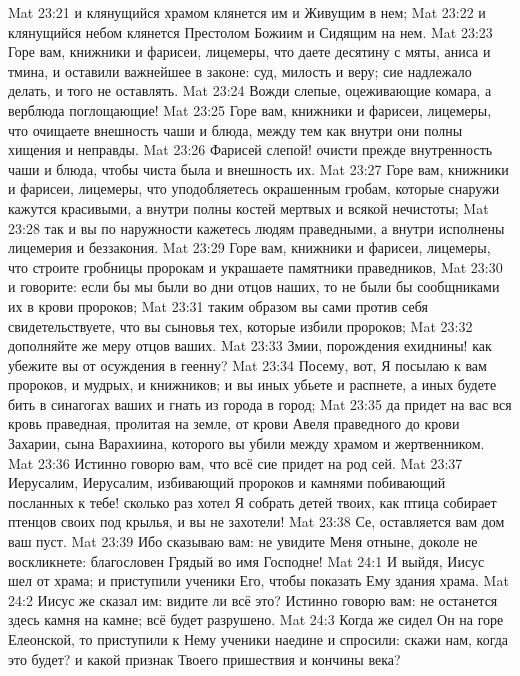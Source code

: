 \vs Mat 23:21 и клянущийся храмом клянется им и Живущим в нем;
\vs Mat 23:22 и клянущийся небом клянется Престолом Божиим и Сидящим на нем.
\vs Mat 23:23 Горе вам, книжники и фарисеи, лицемеры, что даете десятину с мяты, аниса и тмина, и оставили важнейшее в законе: суд, милость и веру; сие надлежало делать, и того не оставлять.
\vs Mat 23:24 Вожди слепые, оцеживающие комара, а верблюда поглощающие!
\vs Mat 23:25 Горе вам, книжники и фарисеи, лицемеры, что очищаете внешность чаши и блюда, между тем как внутри они полны хищения и неправды.
\vs Mat 23:26 Фарисей слепой! очисти прежде внутренность чаши и блюда, чтобы чиста была и внешность их.
\vs Mat 23:27 Горе вам, книжники и фарисеи, лицемеры, что уподобляетесь окрашенным гробам, которые снаружи кажутся красивыми, а внутри полны костей мертвых и всякой нечистоты;
\vs Mat 23:28 так и вы по наружности кажетесь людям праведными, а внутри исполнены лицемерия и беззакония.
\vs Mat 23:29 Горе вам, книжники и фарисеи, лицемеры, что строите гробницы пророкам и украшаете памятники праведников,
\vs Mat 23:30 и говорите: если бы мы были во дни отцов наших, то не были бы сообщниками их в  крови пророков;
\vs Mat 23:31 таким образом вы сами против себя свидетельствуете, что вы сыновья тех, которые избили пророков;
\vs Mat 23:32 дополняйте же меру отцов ваших.
\vs Mat 23:33 Змии, порождения ехиднины! как убежите вы от осуждения в геенну?
\vs Mat 23:34 Посему, вот, Я посылаю к вам пророков, и мудрых, и книжников; и вы иных убьете и распнете, а иных будете бить в синагогах ваших и гнать из города в город;
\vs Mat 23:35 да придет на вас вся кровь праведная, пролитая на земле, от крови Авеля праведного до крови Захарии, сына Варахиина, которого вы убили между храмом и жертвенником.
\vs Mat 23:36 Истинно говорю вам, что всё сие придет на род сей.
\vs Mat 23:37 Иерусалим, Иерусалим, избивающий пророков и камнями побивающий посланных к тебе! сколько раз хотел Я собрать детей твоих, как птица собирает птенцов своих под крылья, и вы не захотели!
\vs Mat 23:38 Се, оставляется вам дом ваш пуст.
\vs Mat 23:39 Ибо сказываю вам: не увидите Меня отныне, доколе не воскликнете: благословен Грядый во имя Господне!
\vs Mat 24:1 И выйдя, Иисус шел от храма; и приступили ученики Его, чтобы показать Ему здания храма.
\vs Mat 24:2 Иисус же сказал им: видите ли всё это? Истинно говорю вам: не останется здесь камня на камне; всё будет разрушено.
\rsbpar\vs Mat 24:3 Когда же сидел Он на горе Елеонской, то приступили к Нему ученики наедине и спросили: скажи нам, когда это будет? и какой признак Твоего пришествия и кончины века?
